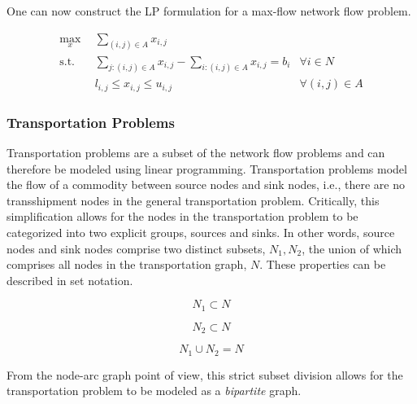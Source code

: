 One can now construct the LP formulation for a max-flow network flow problem.

\begin{subequations}\label{eqs:max-flow}
  \begin{align}
    \max_{x} \:\: & 
    \sum_{(i, j) \in A} x_{i,j}
    & \label{eqs:max-flow_obj} \\
    \text{s.t.} \:\: &
    \sum_{j:(i,j) \in A} x_{i,j} - \sum_{i:(i,j) \in A} x_{i,j} = b_i
    & \forall i \in N \label{eqs:max-flow_sup} \\
    &
    l_{i,j} \leq x_{i,j} \leq u_{i,j}
    & \forall (i, j) \in A \label{eqs:max-flow_x}
  \end{align}
\end{subequations}

\subsubsection{Transportation Problems}
Transportation problems are a subset of the network flow problems and can
therefore be modeled using linear programming. Transportation problems model the
flow of a commodity between source nodes and sink nodes, i.e., there are no
transshipment nodes in the general transportation problem. Critically, this
simplification allows for the nodes in the transportation problem to be
categorized into two explicit groups, sources and sinks. In other words, source
nodes and sink nodes comprise two distinct subsets, $N_1, N_2$, the union of
which comprises all nodes in the transportation graph, $N$. These properties can
be described in set notation.

\begin{equation}
  N_1 \subset N
\end{equation}

\begin{equation}
 N_2 \subset N
\end{equation}

\begin{equation}
  N_1 \cup N_2 = N
\end{equation}

From the node-arc graph point of view, this strict subset division allows for
the transportation problem to be modeled as a \textit{bipartite} graph.

